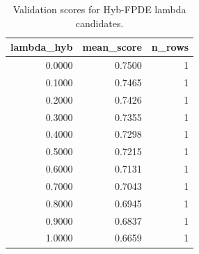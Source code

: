 \begin{table}[t]
\caption{Validation scores for Hyb-FPDE lambda candidates.}
\label{tab:lambda_distribution_computed}
\centering
\begin{tabular}{rrr}
\toprule
lambda\_hyb & mean\_score & n\_rows \\
\midrule
0.0000 & 0.7500 & 1 \\
0.1000 & 0.7465 & 1 \\
0.2000 & 0.7426 & 1 \\
0.3000 & 0.7355 & 1 \\
0.4000 & 0.7298 & 1 \\
0.5000 & 0.7215 & 1 \\
0.6000 & 0.7131 & 1 \\
0.7000 & 0.7043 & 1 \\
0.8000 & 0.6945 & 1 \\
0.9000 & 0.6837 & 1 \\
1.0000 & 0.6659 & 1 \\
\bottomrule
\end{tabular}

\end{table}
